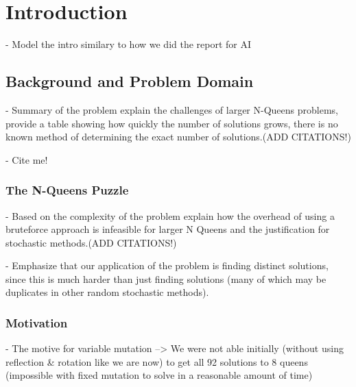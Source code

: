 \documentclass{sig-alternate}
\begin{document}




% 
%
\section{Introduction}

- Model the intro similary to how we did the report for AI


\subsection{Background and Problem Domain}

- Summary of the problem explain the challenges of larger N-Queens problems, 
  provide a table showing how quickly the number of solutions grows, there is
  no known method of determining the exact number of solutions.(ADD CITATIONS!)
  
- Cite me!\cite{crawford1992solving,homaifar1992e1,andrews2006investigation,tuson1998adapting, wolpert1997no,srinivas1994adaptive,goldberg1988genetic}

\subsubsection{The N-Queens Puzzle}

- Based on the complexity of the problem explain how the overhead of using a bruteforce 
  approach is infeasible for larger N Queens and the justification for stochastic
  methods.(ADD CITATIONS!)

- Emphasize that our application of the problem is finding distinct solutions,
  since this is much harder than just finding solutions (many of which may be
  duplicates in other random stochastic methods).


\subsubsection{Motivation}
- The motive for variable mutation
    --> We were not able initially (without using reflection \& rotation like we
        are now) to get all 92 solutions to 8 queens (impossible with fixed mutation to solve
        in a reasonable amount of time)
    
\end{document}
